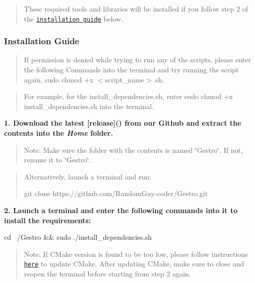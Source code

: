\begin{quote}
These required tools and libraries will be installed if you follow step 2 of the \href{#installation-guide}{\tt installation guide} below. \end{quote}


\subsubsection*{Installation Guide}

\begin{quote}
If permission is denied while trying to run any of the scripts, please enter the following Commands into the terminal and try running the script again, {\ttfamily sudo chmod +x $<$script\+\_\+name$>$.sh}. \end{quote}


\begin{quote}
For example, for the install\+\_\+dependencies.\+sh, enter {\ttfamily sudo chmod +x install\+\_\+dependencies.\+sh} into the terminal. \end{quote}


{\bfseries 1. Download the latest \mbox{[}release\mbox{]}() from our Github and extract the contents into the {\itshape Home} folder.}

\begin{quote}
Note\+: Make sure the folder with the contents is named \char`\"{}\+Gestro\char`\"{}. If not, rename it to \char`\"{}\+Gestro\char`\"{}. \end{quote}


\begin{quote}
Alternatively, launch a terminal and run\+: 
\begin{DoxyCode}
git clone https://github.com/RandomGuy-coder/Gestro.git
\end{DoxyCode}
 \end{quote}


{\bfseries 2. Launch a terminal and enter the following commands into it to install the requirements\+:} 
\begin{DoxyCode}
cd ~/Gestro && sudo ./install\_dependencies.sh
\end{DoxyCode}
 \begin{quote}
Note\+: If C\+Make version is found to be too low, please follow instructions \href{https://askubuntu.com/a/829311}{\tt here} to update C\+Make. After updating C\+Make, make sure to close and reopen the terminal before starting from step 2 again. \end{quote}


